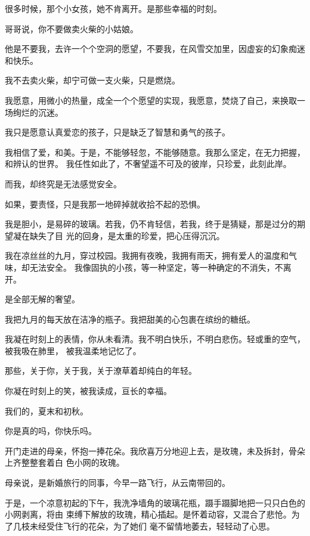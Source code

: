 		很多时候，那个小女孩，她不肯离开。是那些幸福的时刻。


		哥哥说，你不要做卖火柴的小姑娘。

		他是不要我，去许一个个空洞的愿望，不要我，在风雪交加里，因虚妄的幻象痴迷和快乐。

		我不去卖火柴，却宁可做一支火柴，只是燃烧。

		我愿意，用微小的热量，成全一个个愿望的实现，我愿意，焚烧了自己，来换取一场绚烂的沉迷。

		我只是愿意认真爱恋的孩子，只是缺乏了智慧和勇气的孩子。

		我相信了爱，和美。于是，不能够轻忽，不能够随意。我那么坚定，在无力把握，和辨认的世界。
	我任性如此了，不奢望遥不可及的彼岸，只珍爱，此刻此岸。


		而我，却终究是无法感觉安全。

		如果，要责怪，只是我那一地碎掉就收拾不起的恐惧。

		我是胆小，是易碎的玻璃。若我，仍不肯轻信，若我，终于是猜疑，那是过分的期望凝在缺失了目
	光的回身，是太重的珍爱，把心压得沉沉。

		我在凉丝丝的九月，穿过校园。我拥有夜晚，我拥有雨天，拥有爱人的温度和气味，却无法安全。
	我像固执的小孩，等一种坚定，等一种确定的不消失，不离开。

		是全部无解的奢望。


		\vspace{1em}
		我把九月的每天放在洁净的瓶子。我把甜美的心包裹在缤纷的糖纸。

		我凝在时刻上的表情，你从未看清。我不明白快乐，不明白悲伤。轻或重的空气，被我吸在肺里，
	被我温柔地记忆了。

		那些，关于你，关于我，关于潦草着却纯白的年轻。

		你凝在时刻上的笑，被我读成，亘长的幸福。

		我们的，夏末和初秋。

		你是真的吗，你快乐吗。

	\endwriting



		开门走进的母亲，怀抱一捧花朵。我欣喜万分地迎上去，是玫瑰，未及拆封，骨朵上齐整整套着白
	色小网的玫瑰。

		母亲说，是新婚旅行的同事，今早一路飞行，从云南带回的。


		于是，一个凉意初起的下午，我洗净墙角的玻璃花瓶，蹑手蹑脚地把一只只白色的小网剥离，将由
	束缚下解放的玫瑰，精心插起。是怀着动容，又混合了悲怆。为了几枝未经受住飞行的花朵，为了她们
	毫不留情地萎去，轻轻动了心思。

